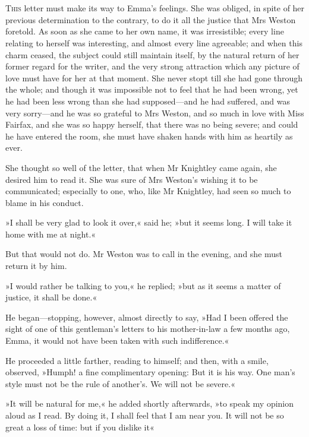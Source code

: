\chapter[Chapter \thechapter]{}
\lettrine[lines=4,lraise=0.3]{T}{his} letter must make its way to Emma's feelings. She was obliged, in spite of her previous determination to the contrary, to do it all the justice that Mrs Weston foretold. As soon as she came to her own name, it was irresistible; every line relating to herself was interesting, and almost every line agreeable; and when this charm ceased, the subject could still maintain itself, by the natural return of her former regard for the writer, and the very strong attraction which any picture of love must have for her at that moment. She never stopt till she had gone through the whole; and though it was impossible not to feel that he had been wrong, yet he had been less wrong than she had supposed—and he had suffered, and was very sorry—and he was so grateful to Mrs Weston, and so much in love with Miss Fairfax, and she was so happy herself, that there was no being severe; and could he have entered the room, she must have shaken hands with him as heartily as ever.

She thought so well of the letter, that when Mr Knightley came again, she desired him to read it. She was sure of Mrs Weston's wishing it to be communicated; especially to one, who, like Mr Knightley, had seen so much to blame in his conduct.

»I shall be very glad to look it over,« said he; »but it seems long. I will take it home with me at night.«

But that would not do. Mr Weston was to call in the evening, and she must return it by him.

»I would rather be talking to you,« he replied; »but as it seems a matter of justice, it shall be done.«

He began—stopping, however, almost directly to say, »Had I been offered the sight of one of this gentleman's letters to his mother-in-law a few months ago, Emma, it would not have been taken with such indifference.«

He proceeded a little farther, reading to himself; and then, with a smile, observed, »Humph! a fine complimentary opening: But it is his way. One man's style must not be the rule of another's. We will not be severe.«

»It will be natural for me,« he added shortly afterwards, »to speak my opinion aloud as I read. By doing it, I shall feel that I am near you. It will not be so great a loss of time: but if you dislike it\longdash«

